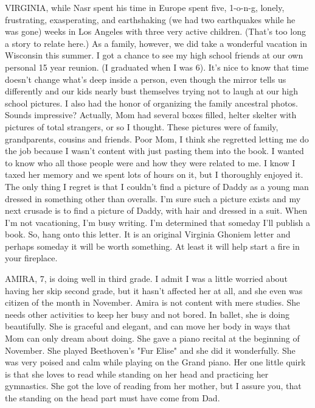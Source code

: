 VIRGINIA, while Nasr spent his time in Europe spent five, 1-o-n-g, lonely, frustrating, exasperating, and earthshaking (we had two earthquakes
while he was gone) weeks in Los Angeles with three very active children. (That's too long a story to relate here.) As a family, however, we did
take a wonderful vacation in Wisconsin this summer. I got a chance to see my high school friends at our own personal 15 year reunion. (I
graduated when I was 6). It's nice to know that time doesn't change what's deep inside a person, even though the mirror tells us differently and
our kids nearly bust themselves trying not to laugh at our high school pictures. I also had the honor of organizing the family ancestral photos.
Sounds impressive? Actually, Mom had several boxes filled, helter skelter with pictures of total strangers, or so I thought. These pictures were
of family, grandparents, cousins and friends. Poor Mom, I think she regretted letting me do the job because I wasn't content with just pasting
them into the book. I wanted to know who all those people were and how they were related to me. I know I taxed her memory and we spent lots of
hours on it, but I thoroughly enjoyed it. The only thing I regret is that I couldn't find a picture of Daddy as a young man dressed in something
other than overalls. I'm sure such a picture exists and my next crusade is to find a picture of Daddy, with hair and dressed in a suit. When I'm
not vacationing, I'm busy writing. I'm determined that someday I'll publish a book. So, hang onto this letter. It is an original Virginia
Ghoniem letter and perhaps someday it will be worth something. At least it will help start a fire in your fireplace.


AMIRA, 7, is doing well in third grade. I admit I was a little worried about having her skip second grade, but it hasn't affected her at all,
and she even was citizen of the month in November. Amira is not content with mere studies. She needs other activities to keep her busy and not
bored. In ballet, she is doing beautifully. She is graceful and elegant, and can move her body in ways that Mom can only dream about doing. She
gave a piano recital at the beginning of November. She played Beethoven's "Fur Elise" and she did it wonderfully. She was very poised and calm
while playing on the Grand piano. Her one little quirk is that she loves to read while standing on her head and practicing her gymnastics. She
got the love of reading from her mother, but I assure you, that the standing on the head part must have come from Dad.

